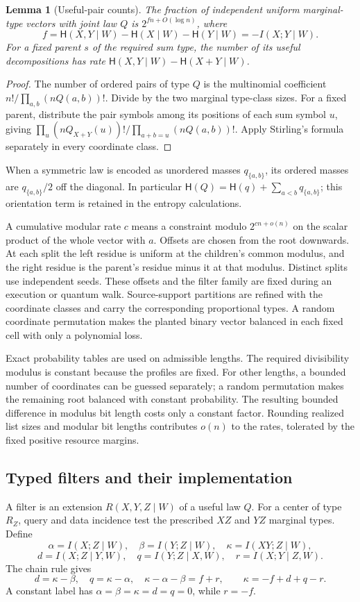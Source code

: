 \documentclass[10pt,a4paper]{article}
\newtheorem{lemma}[theorem]{Lemma}
\theoremstyle{definition}
\newcommand{\HH}{\mathsf H}
\begin{document}
\begin{lemma}[Useful-pair counts]\label{lem:type-counts}
The fraction of independent uniform marginal-type vectors with joint
law $Q$ is $2^{fn+O(\log n)}$, where
\[
 f=\HH(X,Y\mid W)-\HH(X\mid W)-\HH(Y\mid W)
   =-I(X;Y\mid W).
\]
For a fixed parent $s$ of the required sum type, the number of its
useful decompositions has rate
$\HH(X,Y\mid W)-\HH(X+Y\mid W)$.
\end{lemma}
\begin{proof}
The number of ordered pairs of type $Q$ is the multinomial coefficient
$n!/\prod_{a,b}(nQ(a,b))!$. Divide by the two marginal type-class sizes.
For a fixed parent, distribute the pair symbols among its positions of
each sum symbol $u$, giving
$\prod_u (nQ_{X+Y}(u))!/\prod_{a+b=u}(nQ(a,b))!$.
Apply Stirling's formula separately in every coordinate class.
\end{proof}
When a symmetric law is encoded as unordered masses $q_{\{a,b\}}$,
its ordered masses are $q_{\{a,b\}}/2$ off the diagonal. In particular
$\HH(Q)=\HH(q)+\sum_{a<b}q_{\{a,b\}}$; this orientation term is retained
in the entropy calculations.

A cumulative modular rate $c$ means a constraint modulo
$2^{cn+o(n)}$ on the scalar product of the whole vector with $a$.
Offsets are chosen from the root downwards. At each split the left
residue is uniform at the children's common modulus, and the right
residue is the parent's residue minus it at that modulus. Distinct
splits use independent seeds. These offsets and the filter family are
fixed during an execution or quantum walk. Source-support partitions
are refined with the coordinate classes and carry the corresponding
proportional types. A random coordinate permutation makes the planted
binary vector balanced in each fixed cell with only a polynomial loss.

Exact probability tables are used on admissible lengths. The required
divisibility modulus is constant because the profiles are fixed. For
other lengths, a bounded number of coordinates can be guessed separately;
a random permutation makes the remaining root balanced with constant
probability. The resulting bounded difference in modulus bit length
costs only a constant factor. Rounding realized list sizes and modular
bit lengths contributes $o(n)$ to the rates, tolerated by the fixed
positive resource margins.

\subsection{Typed filters and their implementation}
A filter is an extension $R(X,Y,Z\mid W)$ of a useful law $Q$.
For a center of type $R_Z$, query and data incidence test the prescribed
$XZ$ and $YZ$ marginal types. Define
\[
 \alpha=I(X;Z\mid W),\quad \beta=I(Y;Z\mid W),\quad
 \kappa=I(XY;Z\mid W),
\]
\[
 d=I(X;Z\mid Y,W),\quad q=I(Y;Z\mid X,W),\quad
 r=I(X;Y\mid Z,W).
\]
The chain rule gives
\begin{equation}
 d=\kappa-\beta,\quad q=\kappa-\alpha,\quad
 \kappa-\alpha-\beta=f+r,
 \qquad \kappa=-f+d+q-r.
 \label{eq:filter-identities}
\end{equation}
A constant label has $\alpha=\beta=\kappa=d=q=0$, while $r=-f$.
\end{document}
